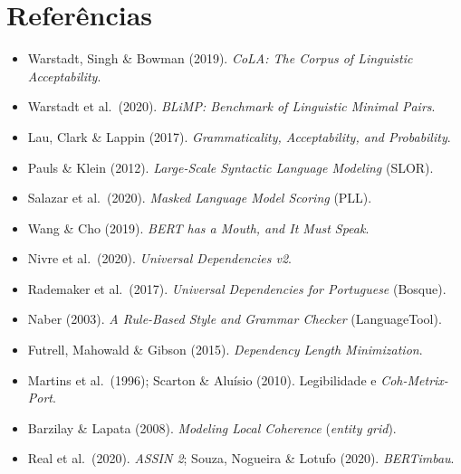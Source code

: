 \documentclass[11pt,a4paper]{article}
\begin{document}
\section*{Referências}
\small
\begin{itemize}\itemsep2pt
\item Warstadt, Singh \& Bowman (2019). \textit{CoLA: The Corpus of Linguistic Acceptability}.
\item Warstadt et al.\ (2020). \textit{BLiMP: Benchmark of Linguistic Minimal Pairs}.
\item Lau, Clark \& Lappin (2017). \textit{Grammaticality, Acceptability, and Probability}.
\item Pauls \& Klein (2012). \textit{Large-Scale Syntactic Language Modeling} (SLOR).
\item Salazar et al.\ (2020). \textit{Masked Language Model Scoring} (PLL).
\item Wang \& Cho (2019). \textit{BERT has a Mouth, and It Must Speak}.
\item Nivre et al.\ (2020). \textit{Universal Dependencies v2}.
\item Rademaker et al.\ (2017). \textit{Universal Dependencies for Portuguese} (Bosque).
\item Naber (2003). \textit{A Rule-Based Style and Grammar Checker} (LanguageTool).
\item Futrell, Mahowald \& Gibson (2015). \textit{Dependency Length Minimization}.
\item Martins et al.\ (1996); Scarton \& Aluísio (2010). Legibilidade e \textit{Coh-Metrix-Port}.
\item Barzilay \& Lapata (2008). \textit{Modeling Local Coherence} (\textit{entity grid}).
\item Real et al.\ (2020). \textit{ASSIN 2}; Souza, Nogueira \& Lotufo (2020). \textit{BERTimbau}.
\end{itemize}
\end{document}
